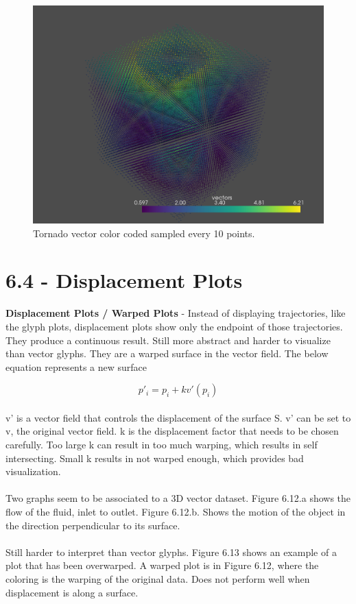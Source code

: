 \documentclass{article}
\begin{document}
\begin{figure}[H]
\caption{Tornado vector color coded sampled every 10 points.}
\centering
\includegraphics[scale=.4]{tornado_color_coding.png}
\end{figure}

\section*{6.4 - Displacement Plots}
\textbf{Displacement Plots / Warped Plots} - Instead of displaying trajectories, like the glyph plots, displacement plots show only the endpoint of those trajectories. They produce a continuous result. Still more abstract and harder to visualize than vector glyphs. They are a warped surface in the vector field. The below equation represents a new surface

\begin{equation}
    p'_i = p_i + kv'(p_i)
\end{equation}
\\
v' is a vector field that controls the displacement of the surface S. v' can be set to v, the original vector field. k is the displacement factor that needs to be chosen carefully. Too large k can result in too much warping, which results in self intersecting. Small k results in not warped enough, which provides bad visualization.
\\\\
Two graphs seem to be associated to a 3D vector dataset. Figure 6.12.a shows the flow of the fluid, inlet to outlet. Figure 6.12.b. Shows the motion of the object in the direction perpendicular to its surface.
\\\\
Still harder to interpret than vector glyphs. Figure 6.13 shows an example of a plot that has been overwarped. A warped plot is in Figure 6.12, where the coloring is the warping of the original data. Does not perform well when displacement is along a surface.
\end{document}
